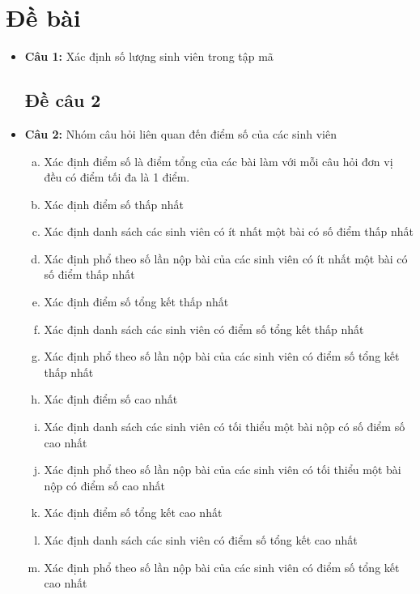 \documentclass[a4paper]{article}
\theoremstyle{definition}
\begin{document}
\section{Đề bài} 
\begin{itemize}
\subsection{Đề câu 1}
\item[] {\textbf{Câu 1: } Xác định số lượng sinh viên trong tập mã}
    
\subsection{Đề câu 2}
\item[] {\textbf{Câu 2: } Nhóm câu hỏi liên quan đến điểm số của các sinh viên }
\begin{enumerate}[a)]
  \item {Xác định điểm số là điểm tổng của các bài làm với mỗi câu hỏi đơn vị đều có điểm tối đa là 1 điểm.}

  \item {Xác định điểm số thấp nhất}
  \item {Xác định danh sách các sinh viên có ít nhất một bài có số điểm thấp nhất}
  \item {Xác định phổ theo số lần nộp bài của các sinh viên có ít nhất một bài có số điểm thấp nhất}
    
  \item {Xác định điểm số tổng kết thấp nhất}
  \item {Xác định danh sách các sinh viên có điểm số tổng kết thấp nhất}
  \item {Xác định phổ theo số lần nộp bài của các sinh viên có điểm số tổng kết thấp nhất}
    
  \item {Xác định điểm số cao nhất}
  \item {Xác định danh sách các sinh viên có tối thiểu một bài nộp có số điểm số cao nhất}
  \item {Xác định phổ theo số lần nộp bài của các sinh viên có tối thiểu một bài nộp có điểm số cao nhất}
    
  \item {Xác định điểm số tổng kết cao nhất}
  \item {Xác định danh sách các sinh viên có điểm số tổng kết cao nhất}
  \item {Xác định phổ theo số lần nộp bài của các sinh viên có điểm số tổng kết cao nhất}
  

\end{enumerate}
\end{itemize}
\end{document}

